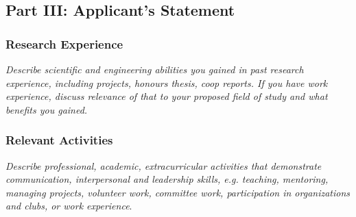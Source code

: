 \documentclass[a4paper,12pt]{article}
\begin{document}
\subsection*{Part III: Applicant's Statement}
\subsubsection*{Research Experience}
\textit{Describe scientific and engineering abilities you gained in past
    research experience, including projects, honours thesis, coop reports. If
    you have work experience, discuss relevance of that to your proposed field
of study and what benefits you gained.}

\subsubsection*{Relevant Activities}
\textit{Describe professional, academic, extracurricular activities that
    demonstrate communication, interpersonal and leadership skills, e.g.
    teaching, mentoring, managing projects, volunteer work, committee work,
participation in organizations and clubs, or work experience}.
\end{document}
